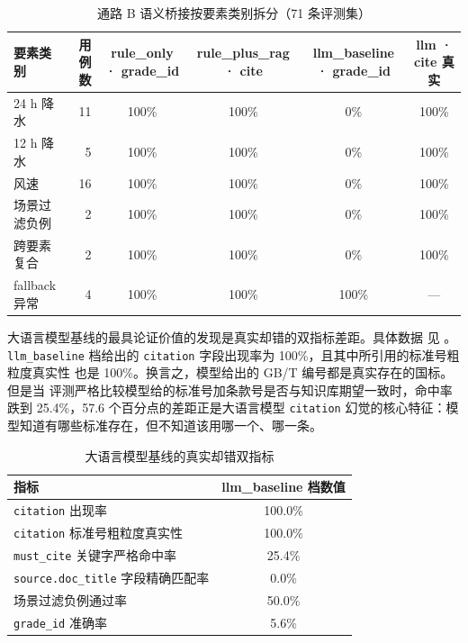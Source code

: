 \begin{table}[!htbp]
    \centering
    \caption{通路 B 语义桥接按要素类别拆分（71 条评测集）}
    \label{tab:bridge-by-category}
    \song\fontsize{9pt}{12pt}\selectfont
    \renewcommand{\arraystretch}{0.95}
    \begin{tabular}{lrcccc}
        \toprule
        要素类别 & 用例数 & rule\_only · grade\_id & rule\_plus\_rag · cite & llm\_baseline · grade\_id & llm · cite 真实 \\
        \midrule
        24 h 降水 & 11 & 100\% & 100\% & 0\% & 100\% \\
        12 h 降水 & 5 & 100\% & 100\% & 0\% & 100\% \\
        风速 & 16 & 100\% & 100\% & 0\% & 100\% \\
        场景过滤负例 & 2 & 100\% & 100\% & 0\% & 100\% \\
        跨要素复合 & 2 & 100\% & 100\% & 0\% & 100\% \\
        fallback 异常 & 4 & 100\% & 100\% & 100\% & --- \\
        \bottomrule
    \end{tabular}
\end{table}

大语言模型基线的最具论证价值的发现是真实却错的双指标差距。具体数据
见 。\texttt{llm\_\bk{}baseline} 档给出的
\texttt{citation} 字段出现率为 100\%，且其中所引用的标准号粗粒度真实性
也是 100\%。换言之，模型给出的 GB/T 编号都是真实存在的国标。但是当
评测严格比较模型给的标准号加条款号是否与知识库期望一致时，命中率
跌到 25.4\%，57.6 个百分点的差距正是大语言模型 \texttt{citation}
幻觉的核心特征：模型知道有哪些标准存在，但不知道该用哪一个、哪一条。

\begin{table}[!htbp]
    \centering
    \caption{大语言模型基线的真实却错双指标}
    \label{tab:bridge-llm-trap}
    \song\wuhao
    \begin{tabular}{lc}
        \toprule
        指标 & llm\_baseline 档数值 \\
        \midrule
        \texttt{citation} 出现率 & 100.0\% \\
        \texttt{citation} 标准号粗粒度真实性 & 100.0\% \\
        \texttt{must\_\bk{}cite} 关键字严格命中率 & 25.4\% \\
        \texttt{source.\bk{}doc\_\bk{}title} 字段精确匹配率 & 0.0\% \\
        场景过滤负例通过率 & 50.0\% \\
        \texttt{grade\_\bk{}id} 准确率 & 5.6\% \\
        \bottomrule
    \end{tabular}
\end{table}


